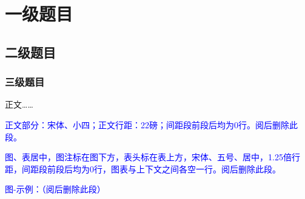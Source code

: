 %
%
%
%
%
%

\chapter{一级题目}

\section{二级题目}

\subsection{三级题目}

正文……

\textcolor{blue}{正文部分：宋体、小四；正文行距：22磅；间距段前段后均为0行。阅后删除此段。}

\textcolor{blue}{图、表居中，图注标在图下方，表头标在表上方，宋体、五号、居中，1.25倍行距，间距段前段后均为0行，图表与上下文之间各空一行。阅后删除此段。}

\textcolor{blue}{图-示例：（阅后删除此段）}
